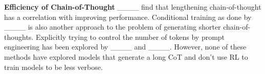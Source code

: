 \textbf{Efficiency of Chain-of-Thought} ____ find that lengthening chain-of-thought has a correlation with improving performance. Conditional training as done by ____ is also another approach to the problem of generating shorter chain-of-thoughts. Explicitly trying to control the number of tokens by prompt engineering has been explored by ____ and ____. However, none of these methods have explored models that generate a long CoT and don't use RL to train models to be less verbose.